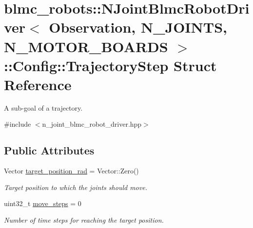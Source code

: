 \hypertarget{structblmc__robots_1_1NJointBlmcRobotDriver_1_1Config_1_1TrajectoryStep}{}\section{blmc\+\_\+robots\+:\+:N\+Joint\+Blmc\+Robot\+Driver$<$ Observation, N\+\_\+\+J\+O\+I\+N\+TS, N\+\_\+\+M\+O\+T\+O\+R\+\_\+\+B\+O\+A\+R\+DS $>$\+:\+:Config\+:\+:Trajectory\+Step Struct Reference}
\label{structblmc__robots_1_1NJointBlmcRobotDriver_1_1Config_1_1TrajectoryStep}


A sub-\/goal of a trajectory.  




{\ttfamily \#include $<$n\+\_\+joint\+\_\+blmc\+\_\+robot\+\_\+driver.\+hpp$>$}

\subsection*{Public Attributes}
\begin{DoxyCompactItemize}
\item 
\mbox{\label{structblmc__robots_1_1NJointBlmcRobotDriver_1_1Config_1_1TrajectoryStep_a3c03278743cdf69bf8703b8aa79fcfa8}} 
Vector \hyperlink{structblmc__robots_1_1NJointBlmcRobotDriver_1_1Config_1_1TrajectoryStep_a3c03278743cdf69bf8703b8aa79fcfa8}{target\+\_\+position\+\_\+rad} = Vector\+::\+Zero()
\begin{DoxyCompactList}\small\item\em Target position to which the joints should move. \end{DoxyCompactList}\item 
\mbox{\label{structblmc__robots_1_1NJointBlmcRobotDriver_1_1Config_1_1TrajectoryStep_a7f25136ce7f8bfdbb2e049adee6d9312}} 
uint32\+\_\+t \hyperlink{structblmc__robots_1_1NJointBlmcRobotDriver_1_1Config_1_1TrajectoryStep_a7f25136ce7f8bfdbb2e049adee6d9312}{move\+\_\+steps} = 0
\begin{DoxyCompactList}\small\item\em Number of time steps for reaching the target position. \end{DoxyCompactList}\end{DoxyCompactItemize}


